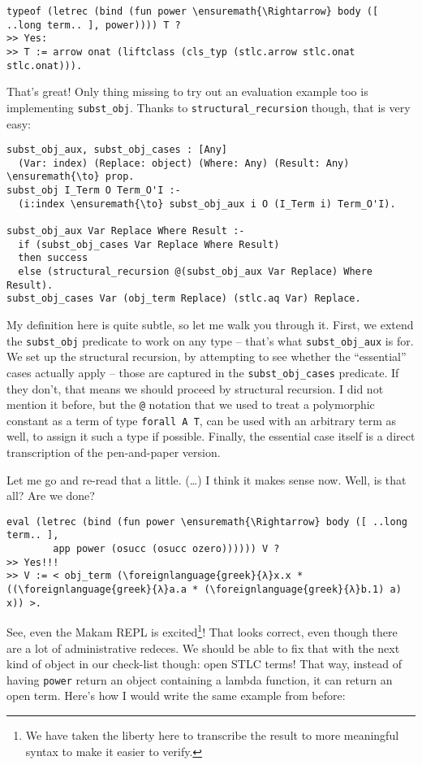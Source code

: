 \begin{verbatim}
typeof (letrec (bind (fun power \ensuremath{\Rightarrow} body ([ ..long term.. ], power)))) T ?
>> Yes:
>> T := arrow onat (liftclass (cls_typ (stlc.arrow stlc.onat stlc.onat))).
\end{verbatim}

\heroADVISOR{} That's great! Only thing missing to try out an evaluation
example too is implementing \texttt{subst\_obj}. Thanks to
\texttt{structural\_recursion} though, that is very easy:

\begin{verbatim}
subst_obj_aux, subst_obj_cases : [Any]
  (Var: index) (Replace: object) (Where: Any) (Result: Any) \ensuremath{\to} prop.
subst_obj I_Term O Term_O'I :-
  (i:index \ensuremath{\to} subst_obj_aux i O (I_Term i) Term_O'I).

subst_obj_aux Var Replace Where Result :-
  if (subst_obj_cases Var Replace Where Result)
  then success
  else (structural_recursion @(subst_obj_aux Var Replace) Where Result).
subst_obj_cases Var (obj_term Replace) (stlc.aq Var) Replace.
\end{verbatim}

\noindent
My definition here is quite subtle, so let me walk you through it.
First, we extend the \texttt{subst\_obj} predicate to work on any type
-- that's what \texttt{subst\_obj\_aux} is for. We set up the structural
recursion, by attempting to see whether the ``essential'' cases actually
apply -- those are captured in the \texttt{subst\_obj\_cases} predicate.
If they don't, that means we should proceed by structural recursion. I
did not mention it before, but the \texttt{@} notation that we used to
treat a polymorphic constant as a term of type \texttt{forall\ A\ T},
can be used with an arbitrary term as well, to assign it such a type if
possible. Finally, the essential case itself is a direct transcription
of the pen-and-paper version.

\heroSTUDENT{} Let me go and re-read that a little. (\ldots{}) I think it
makes sense now. Well, is that all? Are we done?

\begin{verbatim}
eval (letrec (bind (fun power \ensuremath{\Rightarrow} body ([ ..long term.. ],
        app power (osucc (osucc ozero)))))) V ?
>> Yes!!!
>> V := < obj_term (\foreignlanguage{greek}{λ}x.x * ((\foreignlanguage{greek}{λ}a.a * (\foreignlanguage{greek}{λ}b.1) a) x)) >.
\end{verbatim}

\heroADVISOR{} See, even the Makam REPL is
excited\footnote{We have taken the liberty here to transcribe the result to more meaningful syntax to make it easier to verify.}!
That looks correct, even though there are a lot of administrative
redeces. We should be able to fix that with the next kind of object in
our check-list though: open STLC terms! That way, instead of having
\texttt{power} return an object containing a lambda function, it can
return an open term. Here's how I would write the same example from
before:

